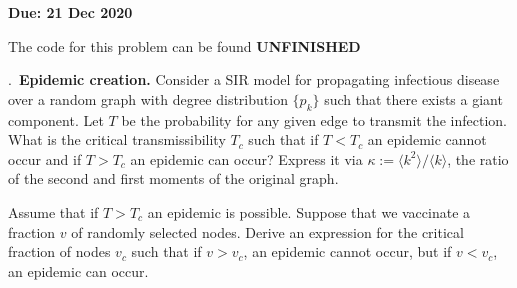 \documentclass{letter}
\newcounter{problem}
\newcommand{\Problem}[2]{%
	\stepcounter{problem}%
	\leftskip=0pt%
	\theproblem.~\textbf{{#1.}} #2 \par%
}
\newcommand{\Due}[1]{\textbf{Due: #1} \par}
\newcommand{\UNFINISHED}{\textbf{\color{red} UNFINISHED}}
\begin{document}
    \Due{21 Dec 2020}

    The code for this problem can be found \UNFINISHED

    \Problem{Epidemic creation}{Consider a SIR model for propagating infectious disease over a random graph with degree distribution $\{p_k\}$ such that there exists a giant component. Let $T$ be the probability for any given edge to transmit the infection. What is the critical transmissibility $T_c$ such that if $T < T_c$ an epidemic cannot occur and if $T > T_c$ an epidemic can occur? Express it via $\kappa := \langle k^2 \rangle / \langle k \rangle$, the ratio of the second and first moments of the original graph. 
    
    Assume that if $T > T_c$ an epidemic is possible. Suppose that we vaccinate a fraction $v$ of randomly selected nodes. Derive an expression for the critical fraction of nodes $v_c$ such that if $v > v_c$, an epidemic cannot occur, but if $v < v_c$, an epidemic can occur.}
\end{document}
